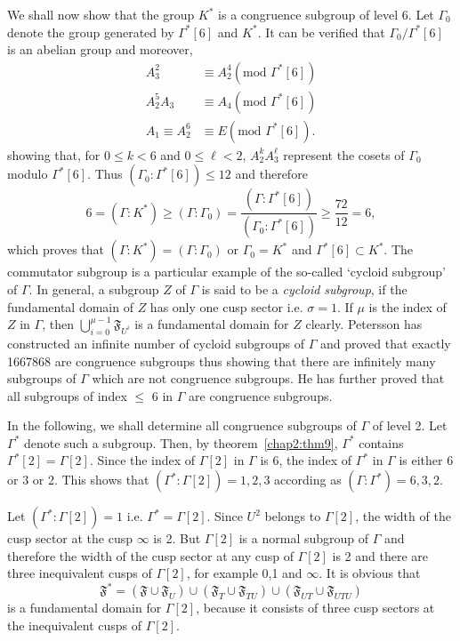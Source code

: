 We shall now show that the group $K^{\ast}$ is a congruence subgroup
of level 6. Let $\Gamma_0$ denote the group generated by
$\Gamma^{\ast}[6]$ and $K^{\ast}$. It can be verified that
$\Gamma_0/\Gamma^{\ast} [6]$ is an abelian group and moreover,
\begin{align*}
A^2_3 & \equiv A^4_2 (\text{mod } \Gamma^{\ast} [6])\\
A^5_2 A_3 & \equiv A_4 (\text{mod } \Gamma^{\ast} [6])\\
A_1 \equiv A^6_2 & \equiv E (\text{mod } \Gamma^{\ast}[6]). 
\end{align*}
showing \pageoriginale that, for $0\leq k < 6$ and $0\leq \ell < 2$,
$A^k_2 A^{\ell}_3 $ represent the cosets of $\Gamma_0$ modulo
$\Gamma^{\ast}[6]$. Thus
$(\Gamma_0:\Gamma^{\ast}[6])\leq 12$ and 
therefore
$$
6=(\Gamma:K^{\ast}) \geq (\Gamma:\Gamma_0) =
\frac{(\Gamma:\Gamma^{\ast} [6])}{(\Gamma_0:\Gamma^{\ast}[6])} \geq
\frac{72}{12} = 6, 
$$
which proves that $(\Gamma:K^{\ast})=(\Gamma:\Gamma_0)$ or $\Gamma_0 =
K^{\ast}$ and $\Gamma^{\ast}[6] \subset K^{\ast}$. The commutator
subgroup is a particular example of the so-called `cycloid subgroup'
of $\Gamma$. In general, a subgroup $Z$ of $\Gamma$ is said to be a
\textit{cycloid subgroup}, if the fundamental domain of $Z$ has only
one cusp sector i.e. $\sigma = 1$. If $\mu$ is the index of $Z$ in
$\Gamma$, then $\bigcup^{\mu-1}_{i=0} \mathfrak{F}_{U^i}$ is a
fundamental domain for $Z$ clearly. Petersson has constructed an
infinite number of cycloid subgroups of $\Gamma$ and proved that
exactly 1667868 are congruence subgroups thus showing that there are
infinitely many subgroups of $\Gamma$ which are not congruence
subgroups. He has further proved that all subgroups of index $\leq$ 6
in $\Gamma$ are congruence subgroups.

In the following, we shall determine all congruence subgroups of
$\Gamma$ of level 2. Let $\Gamma^{\ast}$ denote such a subgroup. Then,
by theorem~\ref{chap2:thm9}, $\Gamma^{\ast}$ contains $\Gamma^{\ast}[2] =
\Gamma[2]$. Since the index of $\Gamma[2]$ in $\Gamma$
is 6, the index 
of $\Gamma^{\ast}$ in $\Gamma$ is either 6 or 3 or 2. This shows that
$(\Gamma^{\ast} :\Gamma[2])=1,2,3$ according as
$(\Gamma:\Gamma^{\ast})=6,3,2$. 

Let $(\Gamma^{\ast}:\Gamma[2])=1$
i.e. $\Gamma^{\ast}=\Gamma[2]$. Since $U^2$ belongs to
$\Gamma[2]$, 
the width of the cusp sector at the cusp $\infty$ is 2. But
$\Gamma[2]$ is a normal subgroup of $\Gamma$ and therefore the width
of the cusp sector at any cusp of $\Gamma[2]$ is 2 and there are
three inequivalent cusps of $\Gamma[2]$, for example 0,1 and
$\infty$. It is obvious that 
$$
\mathfrak{F}^{\ast} = (\mathfrak{F}\cup \mathfrak{F}_U) \cup
(\mathfrak{F}_T \cup \mathfrak{F}_{TU}) \cup (\mathfrak{F}_{UT} \cup
\mathfrak{F}_{UTU}) 
$$\pageoriginale
is a fundamental domain for $\Gamma[2]$, because it consists of three
cusp sectors at the inequivalent cusps of $\Gamma[2]$.

